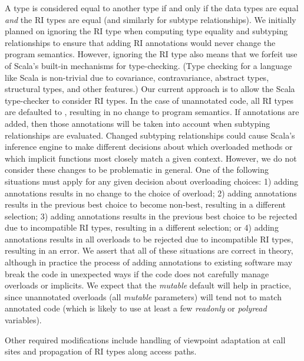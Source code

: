 A type is considered equal to another type if and only if
the data types are equal \emph{and} the RI types are equal
(and similarly for subtype relationships).
We initially planned on ignoring the RI type when computing type equality
and subtyping relationships to ensure that adding RI annotations would never change
the program semantics. However, ignoring the RI type also means that we forfeit
use of Scala's built-in mechanisms for type-checking.
(Type checking for a language like Scala is non-trivial due to covariance,
contravariance, abstract types, structural types, and other features.)
Our current approach is to allow the Scala type-checker to consider
RI types. In the case of unannotated code, all RI types are defaulted to
, resulting in no change to program semantics.
If annotations are added, then those annotations will be taken into account
when subtyping relationships are evaluated.
Changed subtyping relationships could cause Scala's inference engine
to make different decisions about which overloaded methods or which
implicit functions most closely match a given context.
However, we do not consider these changes to be problematic in general.
One of the following situations must apply for any given decision about overloading choices:
1) adding annotations results in no change to the choice of overload;
2) adding annotations results in the previous best choice to become non-best,
	resulting in a different selection;
3) adding annotations results in the previous best choice to be rejected due
to incompatible RI types, resulting in a different selection; or
4) adding annotations results in all overloads to be rejected due to incompatible RI types,
	resulting in an error.
We assert that all of these situations are correct in theory,
although in practice the process of adding annotations to existing software
may break the code in unexpected ways if the code does not carefully manage overloads or implicits.
We expect that the \emph{mutable} default will help in practice,
since unannotated overloads (all \emph{mutable} parameters) will tend not to match annotated code
(which is likely to use at least a few \emph{readonly} or \emph{polyread} variables).




Other required modifications include handling of viewpoint adaptation
at call sites and propagation of RI types along access paths.

